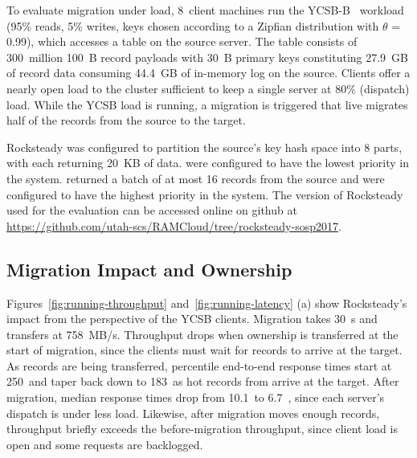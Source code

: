 
To evaluate migration under load, 8~client machines run the YCSB-B~\cite{ycsb}
workload (95\% reads, 5\% writes, keys chosen according to a Zipfian
distribution with $\theta$ = 0.99), which accesses a table on the source
server. The table consists of 300~million 100~B record payloads with 30~B
primary keys constituting 27.9~GB of record data consuming 44.4~GB of in-memory
log on the source. Clients offer a nearly open load to the cluster sufficient to keep
a single server at 80\% (dispatch) load.  While the YCSB load is running, a
migration is triggered that live migrates half of the records from the source
to the target.

Rocksteady was configured to partition the source's key hash space into
8 parts, with each \pull returning 20~KB of data. \pulls were configured
to have the lowest priority in the system. \priopulls returned a batch
of at most 16 records from the
source and were configured
to have the highest priority in the system. The version of Rocksteady
used for the evaluation can be accessed online on github at\linebreak{}
{\small\url{https://github.com/utah-scs/RAMCloud/tree/rocksteady-sosp2017}}.

\subsection{Migration Impact and Ownership}
\label{sec:e2e}
Figures~\ref{fig:running-throughput} and~\ref{fig:running-latency} (a) show
Rocksteady's impact from the perspective of the YCSB clients. Migration
takes 30~s and transfers at 758~MB/s. Throughput drops when ownership is
transferred at the start of migration, since the clients must wait for records
to arrive at the target. As records are being transferred, \nnnth percentile
end-to-end response times start at 250~\us and taper back down to 183~\us as
hot records from \priopulls arrive at the target. After migration, median
response times drop from 10.1~\us to 6.7~\us, since each server's dispatch is under
less load. Likewise, after migration moves enough records, throughput briefly
exceeds the before-migration throughput, since client load is open and some
requests are backlogged.

